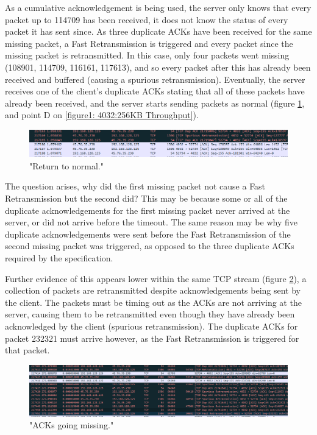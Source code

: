 \documentclass[12pt]{article}
\begin{document}
As a cumulative acknowledgement is being used, the server only knows that every packet up to 114709 has been received, it does not know the status of every packet it has sent since.
As three duplicate ACKs have been received for the same missing packet, a Fast Retransmission is triggered and every packet since the missing packet is retransmitted.
In this case, only four packets went missing (108901, 114709, 116161, 117613), and so every packet after this has already been received and buffered (causing a spurious retransmission).
Eventually, the server receives one of the client's duplicate ACKs stating that all of these packets have already been received, and the server starts sending packets as normal (figure \ref{figure5: Return to normal}, and point D on \ref{figure1: 4032:256KB Throughput}).

\begin{figure}[!htbp]
  \centering
  \includegraphics[width=\linewidth]{4032-256KB-back-to-normal.PNG}
  \caption{"Return to normal."}
  \label{figure5: Return to normal}
\end{figure}

The question arises, why did the first missing packet not cause a Fast Retransmission but the second did?
This may be because some or all of the duplicate acknowledgements for the first missing packet never arrived at the server, or did not arrive before the timeout.
The same reason may be why five duplicate acknowledgements were sent before the Fast Retransmission of the second missing packet was triggered, as opposed to the three duplicate ACKs required by the specification. 

Further evidence of this appears lower within the same TCP stream (figure \ref{figure6: Missing ACKs}), a collection of packets are retransmitted despite acknowledgements being sent by the client.
The packets must be timing out as the ACKs are not arriving at the server, causing them to be retransmitted even though they have already been acknowledged by the client (spurious retransmission).
The duplicate ACKs for packet 232321 must arrive however, as the Fast Retransmission is triggered for that packet.

\begin{figure}[!htbp]
  \centering
  \includegraphics[width=\linewidth]{4032-256KB-lost-acks.PNG}
  \caption{"ACKs going missing."}
  \label{figure6: Missing ACKs}
\end{figure}
\end{document}
